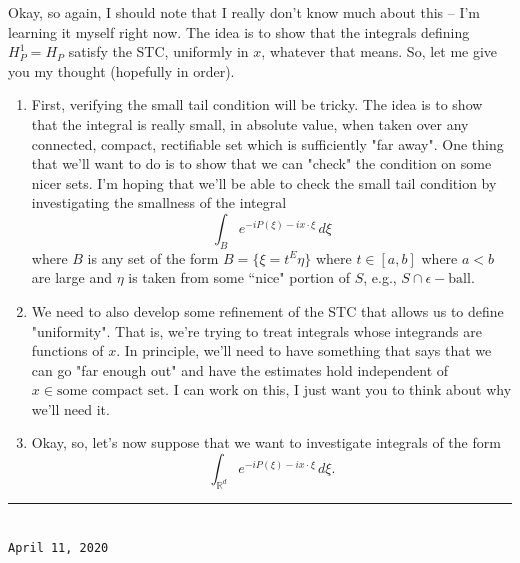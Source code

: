 \documentclass{article}
\theoremstyle{definition}
\begin{document}
Okay, so again, I should note that I really don't know much about this -- I'm learning it myself right now. The idea is to show that the integrals defining $H_P^1=H_P$ satisfy the STC, uniformly in $x$, whatever that means. So, let me give you my thought (hopefully in order). 
\begin{enumerate}
\item First, verifying the small tail condition will be tricky. The idea is to show that the integral is really small, in absolute value, when taken over any connected, compact, rectifiable set which is sufficiently "far away". One thing that we'll want to do is to show that we can "check" the condition on some nicer sets. I'm hoping that we'll be able to check the small tail condition by investigating the smallness of the integral
\begin{equation*}
\int_{B}e^{-iP(\xi)-ix\cdot \xi}\,d\xi
\end{equation*}
where $B$ is any set of the form $B=\{\xi=t^E\eta\}$ where $t\in [a,b]$ where $a<b$ are large and $\eta$ is taken from some ``nice" portion of $S$, e.g., $S\cap\epsilon-\mbox{ball}$.

\item We need to also develop some refinement of the STC that allows us to define "uniformity". That is, we're trying to treat integrals whose integrands are functions of $x$. In principle, we'll need to have something that says that we can go "far enough out" and have the estimates hold independent of $x\in \mbox{some compact set}$. I can work on this, I just want you to think about why we'll need it.

\item Okay, so, let's now suppose that we want to investigate integrals of the form
\begin{equation*}
\int_{\mathbb{R}^d}e^{-iP(\xi)-i x\cdot \xi}\,d\xi. 
\end{equation*}
\end{enumerate}






\hrule
$\,$\\


\noindent \texttt{April 11, 2020}\\
\end{document}
